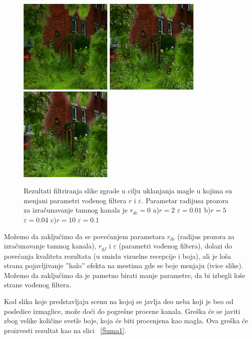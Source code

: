 \documentclass[a4paper,12pt,titlepage]{article}
\begin{document}
\begin{figure}[ht!]
\centering
\includegraphics[width=45mm]{img/hazeResGF2_01.png}
\includegraphics[width=45mm]{img/hazeResGF5_04.png}
\includegraphics[width=45mm]{img/hazeResGF10_1.png}
\caption{Rezultati filtriranja slike zgrade u cilju uklanjanja magle u kojima su menjani parametri vođenog filtera $r$ i $\varepsilon$. Parametar radijusa prozora za izračunavanje tamnog kanala je $r_{dc} = 0$ a)$r = 2$ $\varepsilon = 0.01$ b)$r = 5$ $\varepsilon = 0.04$ c)$r = 10$ $\varepsilon = 0.1$}
\label{UticajRdc}
\end{figure} 

Možemo da zaključimo da se povećanjem parametara $r_{dc}$ (radijus prozora za izračunavanje tamnog kanala), $r_{gf}$ i $\varepsilon$ (parametri vođenog filtera), dolazi do povećanja kvaliteta rezultata (u smislu vizuelne recepcije i boja), ali je loša strana pojavljivanje ''halo'' efekta na mestima gde se boje menjaju (ivice slike). Možemo da zaključimo da je pametno birati manje parametre, da bi izbegli loše strane vođenog filtera.

Kod slika koje predstavljaju scenu na kojoj se javlja deo neba koji je beo od posledice izmaglice, može doći do pogrešne procene kanala. Greška će se javiti zbog velike količine svetle boje, koja će biti procenjena kao magla. Ova greška će proizvesti rezultat kao na slici ~\ref{Šuma1}.
\end{document}

